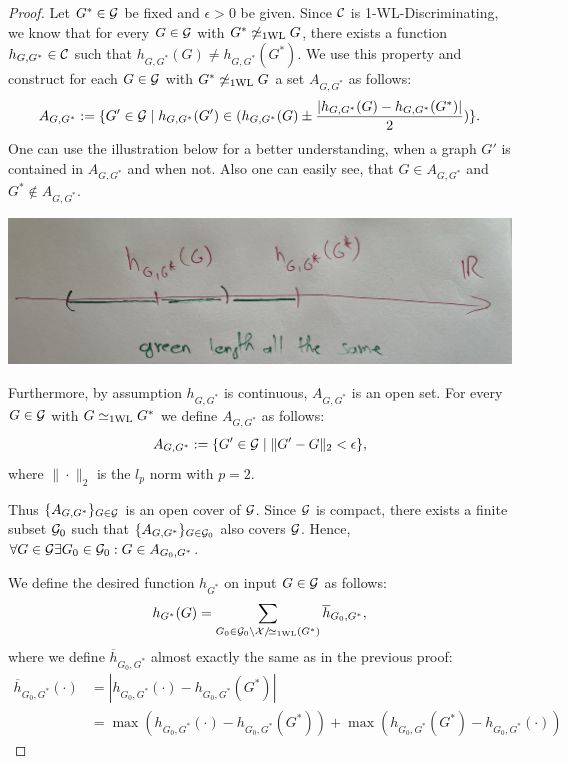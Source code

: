 \begin{proof}
    Let $G^* \in \mathcal{G}$ be fixed and $\epsilon > 0$ be given. Since $\mathcal{C}$ is 1-\!WL-Discriminating, we know that for every $G \in \mathcal{G}$ with $G^* \not\simeq_{\text{1WL}} G$, there exists a function $h_{G, G^*} \in \mathcal{C}$ such that $h_{G, G^*}(G) \neq h_{G, G^*}(G^*)$. We use this property and construct for each $G \in \mathcal{G}$ with $G^* \not\simeq_{\text{1WL}} G$ a set $A_{G, G^*}$ as follows:
    \begin{equation*}
        A_{G, G^*} := \{ G' \in \mathcal{G} \mid h_{G, G^*}(G') \in (h_{G, G^*}(G) \pm \frac{|h_{G, G^*}(G) - h_{G, G^*}(G^*)|}{2})\}.
    \end{equation*}
    One can use the illustration below for a better understanding, when a graph $G'$ is contained in $A_{G, G^*}$ and when not. Also one can easily see, that $G \in A_{G, G^*}$ and $G^* \not\in A_{G, G^*}$.

    \includegraphics[width=\textwidth]{proof idea.jpeg}

   Furthermore, by assumption $h_{G, G^*}$ is continuous, $A_{G, G^*}$ is an open set. For every $G \in \mathcal{G}$ with $G \simeq_{\text{1WL}} G^*$ we define $A_{G, G^*}$ as follows:
    \begin{equation*}
        A_{G, G^*} := \{ G' \in \mathcal{G} \mid \| G' - G \|_2 < \epsilon\},
    \end{equation*}
    where $\|\cdot\|_2$ is the $l_p$ norm with $p=2$.

    Thus $\{ A_{G, G^*} \}_{G \in \mathcal{G}}$ is an open cover of $\mathcal{G}$. Since $\mathcal{G}$ is compact, there exists a finite subset $\mathcal{G}_0$ such that $\{ A_{G, G^*} \}_{G \in \mathcal{G}_0}$ also covers $\mathcal{G}$. Hence, $\forall G \in \mathcal{G} \exists G_0 \in \mathcal{G}_0: G \in A_{G_0, G^*}$.


    We define the desired function $h_{G^*}$ on input $G \in \mathcal{G}$ as follows:
    \begin{equation*}
        h_{G^*}(G) = \sum_{G_0 \in \mathcal{G}_0 \setminus \mathcal{X}/\!{\simeq_{\text{1WL}}}(G^*)} \overline{h}_{G_0, G^*},
    \end{equation*}
    where we define $\overline{h}_{G_0, G^*}$ almost exactly the same as in the previous proof:
    \begin{align*}
        \overline{h}_{G_0, G^*}(\cdot) &= |h_{G_0, G^*}(\cdot) - h_{G_0, G^*}(G^*)| \\
        &= \max(h_{G_0, G^*}(\cdot) - h_{G_0, G^*}(G^*)) + \max(h_{G_0, G^*}(G^*) - h_{G_0, G^*}(\cdot))
    \end{align*}


\end{proof}
